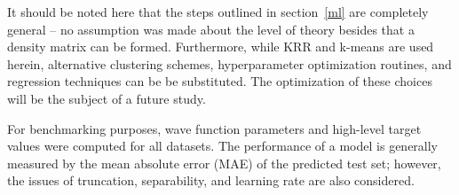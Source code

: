 It should be noted here that the steps outlined in section~\ref{ml} are completely general -- no assumption was made about the level of theory besides that a density matrix can be formed. Furthermore, while KRR and k-means are used herein, alternative clustering schemes, hyperparameter optimization routines, and regression techniques can be be substituted. The optimization of these choices will be the subject of a future study.

For benchmarking purposes, wave function parameters and high-level target values were computed for all datasets. The performance of a model is generally measured by the mean absolute error (MAE) of the predicted test set; however, the issues of truncation, separability, and learning rate are also considered.


